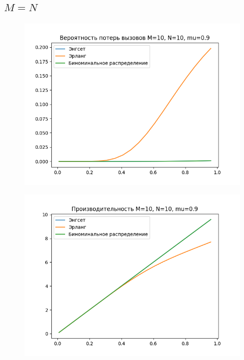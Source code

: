 \documentclass[12pt]{article}
\begin{document}
\subsection{$M = N$}

\begin{figure}[!htb]
\centering
\includegraphics[scale=1.00]{loss_prob_M10_N10_mu09.png}
\caption{}
\label{}
\end{figure}

\begin{figure}[!htb]
\centering
\includegraphics[scale=1.00]{perf_M10_N10_mu09.png}
\caption{}
\label{}
\end{figure}
\end{document}
